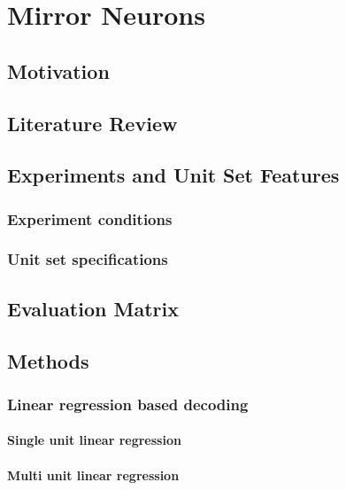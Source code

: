 \documentclass[a4,12pt]{ozu-thesis}
\begin{document}
\chapter{Mirror Neurons}
\section{Motivation}

\section{Literature Review}

\section{Experiments and Unit Set Features}

\subsection{Experiment conditions}

\subsection{Unit set specifications}

\section{Evaluation Matrix}

\section{Methods}
\subsection{Linear regression based decoding}

\subsubsection{Single unit linear regression}

\subsubsection{Multi unit linear regression}

\end{document}
